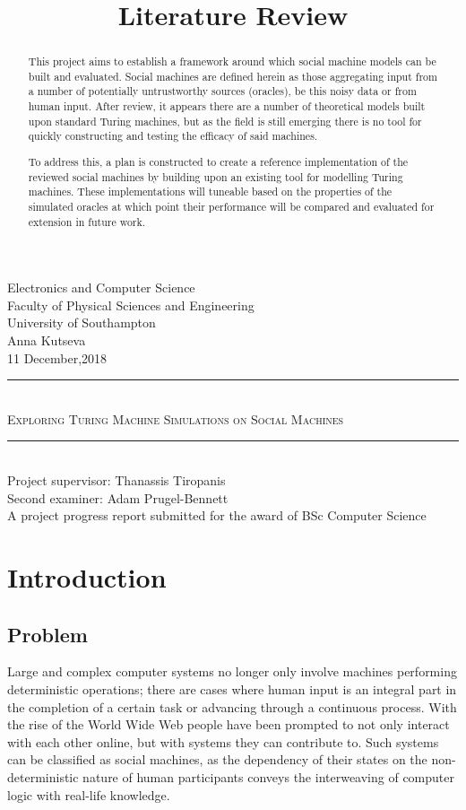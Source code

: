 \documentclass[12pt,a4,xcolor=table]{article}
\title{Literature Review}
\author{}
\date{}
\begin{document}
\begin{titlepage}
	\newcommand{\HRule}{\rule{\linewidth}{0.5mm}}
	\center
	\Large Electronics and Computer Science\\
	\Large Faculty of Physical Sciences and Engineering\\
	\Large University of Southampton\\[1.5cm]
	\Huge Anna Kutseva\\
	{\large 11 December,2018}\\[3cm]
	\HRule \\[0.4cm]
	\textsc{{\huge Exploring Turing Machine Simulations on Social Machines }}\\[0.3cm]
	\HRule \\[1.5cm]
	\LARGE Project supervisor: Thanassis Tiropanis \\
	\LARGE Second examiner: Adam Prugel-Bennett \\[1.5cm]
	\Large A project progress report submitted for the award of BSc Computer Science \\[1.5cm]
\end{titlepage}


\tableofcontents
\thispagestyle{empty}

\newpage
\begin{abstract}
	This project aims to establish a framework around which social machine models can be built and evaluated. Social machines are defined herein as those aggregating input from a number of potentially untrustworthy sources (oracles), be this noisy data or from human input. After review, it appears there are a number of theoretical models built upon standard Turing machines, but as the field is still emerging there is no tool for quickly constructing and testing the efficacy of said machines.
	
	To address this, a plan is constructed to create a reference implementation of the reviewed social machines by building upon an existing tool for modelling Turing machines. These implementations will tuneable based on the properties of the simulated oracles at which point their performance will be compared and evaluated for extension in future work.
\end{abstract}
\thispagestyle{empty}
\clearpage
{} 

\section{Introduction}
\subsection{Problem}
Large and complex computer systems no longer only involve machines performing deterministic operations; there are cases where human input is an integral part in the completion of a certain task or advancing through a continuous process. With the rise of the World Wide Web people have been prompted to not only interact with each other online, but with systems they can contribute to. Such systems can be classified as social machines, as the dependency of their states on the non-deterministic nature of human participants conveys the interweaving of computer logic with real-life knowledge.
\end{document}

